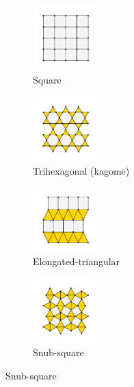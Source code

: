 \begin{figure}[bt]
     \centering
     
     \begin{subfigure}[b]{0.3\textwidth}
         \centering
         \includegraphics[height=2.5cm]{./figures/procrystals/sq.pdf}
         \caption{Square}
         \label{fig:symlatsq}
     \end{subfigure}
     \begin{subfigure}[b]{0.3\textwidth}
         \centering
         \includegraphics[height=2.5cm]{./figures/procrystals/trihex.pdf}
         \caption{Trihexagonal (kagome)}
         \label{fig:symlattrihex}
     \end{subfigure}
     \hfill
     
     \vspace{0.5cm}
     
     \begin{subfigure}[b]{0.3\textwidth}
         \centering
         \includegraphics[height=2.5cm]{./figures/procrystals/elongtri.pdf}
         \caption{Elongated\--triangular}
         \label{fig:symlatelong}
     \end{subfigure}
     \begin{subfigure}[b]{0.3\textwidth}
         \centering
         \includegraphics[height=2.5cm]{./figures/procrystals/snub.pdf}
         \caption{Snub\--square}
         \label{fig:symlatsnub}
     \end{subfigure}
     \hfill
     

\end{figure}
